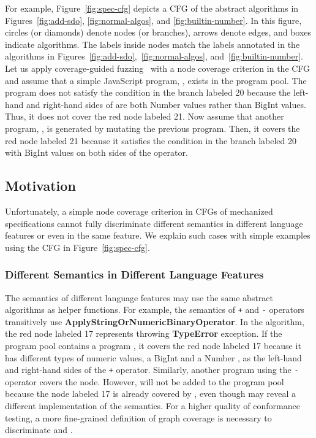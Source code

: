\documentclass[acmsmall,review,screen]{acmart}
\newcommand{\jscode}[1]{\text{\lstinline[style=JS]!#1!}}
\newcommand{\scode}[1]{\texttt{\small{#1}}}
\begin{document}
For example, Figure~\ref{fig:spec-cfg} depicts a CFG of the abstract algorithms
in Figures~\ref{fig:add-sdo}, \ref{fig:normal-algos}, and
\ref{fig:builtin-number}.
In this figure, circles (or diamonds) denote nodes (or branches), arrows denote
edges, and boxes indicate algorithms.
The labels inside nodes match the labels annotated in the algorithms in
Figures~\ref{fig:add-sdo},~\ref{fig:normal-algos}, and~\ref{fig:builtin-number}.
Let us apply coverage-guided fuzzing~\cite{afl} with a node coverage
criterion in the CFG and assume that a simple JavaScript program, \jscode{1 + 2},
exists in the program pool.
The program does not satisfy the condition in the branch labeled 20 because the left-hand and
right-hand sides of \jscode{1 + 2} are both Number values rather than BigInt values.
Thus, it does not cover the red node labeled 21.
Now assume that another program, \jscode{3n + 4n}, is generated by mutating
the previous program.
Then, it covers the red node labeled 21 because it satisfies the condition
in the branch labeled 20 with BigInt values on both sides of the \jscode{+} operator.


\subsection{Motivation}\label{sec:motiv}

Unfortunately, a simple node coverage criterion in CFGs of mechanized
specifications cannot fully discriminate different semantics in different
language features or even in the same feature.
We explain such cases with simple examples using the CFG in Figure~\ref{fig:spec-cfg}.


\subsubsection{Different Semantics in Different Language
Features}\label{sec:diff-feat}

The semantics of different language features may use the same abstract
algorithms as helper functions.
For example, the semantics of \scode{+} and \scode{-}
operators transitively use \textbf{ApplyStringOrNumericBinaryOperator}.
In the algorithm, the red node labeled 17 represents throwing
\textbf{TypeError} exception.
If the program pool contains a program \jscode{2n + 1}, it covers the red node
labeled 17 because it has different types of numeric values, a BigInt
\jscode{2n} and a Number \jscode{1}, as the left-hand and right-hand sides of the
\scode{+} operator.
Similarly, another program \jscode{2n - 1} using the \scode{-} operator
covers the node.
However, \jscode{2n - 1} will not be added to the program pool because
the node labeled 17 is already covered by \jscode{2n + 1},
even though \jscode{2n - 1} may reveal a different implementation of the semantics.
For a higher quality of conformance testing,
a more fine-grained definition of graph coverage is necessary
to discriminate \jscode{2n + 1} and \jscode{2n - 1}.
\end{document}
